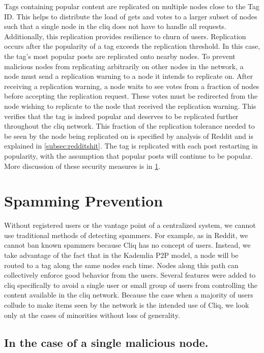 \documentclass{sig-alternate}
\begin{document}
Tags containing popular content are replicated on multiple nodes close to the Tag ID. 
This helps to distribute the load of gets and votes to a larger subset of nodes such that a single node in the cliq does not have to handle all requests. 
Additionally, this replication provides resilience to churn of users. 
Replication occurs after the popularity of a tag exceeds the replication threshold. In this case, the tag's most popular posts are replicated onto nearby nodes. 
To prevent malicious nodes from replicating arbitrarily on other nodes in the network, a node must send a replication warning to a node it intends to replicate on. 
After receiving a replication warning, a node waits to see votes from a fraction of nodes before accepting the replication request. 
These votes must be redirected from the node wishing to replicate to the node that received the replication warning. 
This verifies that the tag is indeed popular and deserves to be replicated further throughout the cliq network. 
This fraction of the replication tolerance needed to be seen by the node being replicated on is specified by analysis of Reddit and is explained in \ref{subsec:redditshit}. 
The tag is replicated with each post restarting in popularity, with the assumption that popular posts will continue to be popular. 
More discussion of these security measures is in \ref{sec:spam}. 

\section{Spamming Prevention}
\label{sec:spam}
Without registered users or the vantage point of a centralized system, we cannot use traditional methods of detecting spammers. For example, as in Reddit, we cannot ban known spammers because Cliq has no concept of users.  Instead, we take advantage of the fact that in the Kademlia P2P model, a node will be routed to a tag along the same nodes each time. Nodes along this path can collectively enforce good behavior from the users. Several features were added to cliq specifically to avoid a single user or small group of users from controlling the content available in the cliq network. Because the case when a majority of users collude to make items seen by the network is the intended use of Cliq, we look only at the cases of minorities without loss of generality. \cite{kademlia}

\subsection{In the case of a single malicious node.}
\label{subsec:spamsingle}
\end{document}
